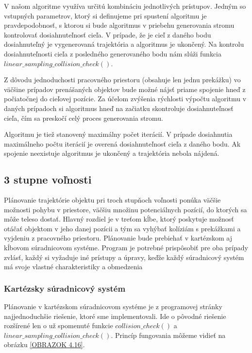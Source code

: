 V našom algoritme využíva určitú kombináciu jednotlivých prístupov.
Jedným so vstupných parametrov, ktorý si definujeme pri spustení algoritmu je pravdepodobnosť, s ktorou si bude algoritmus v priebehu generovania stromu kontrolovať dosiahnuteľnosť cieľa.  V prípade, že je cieľ z daného bodu dosiahnuteľný je vygenerovaná trajektória a algoritmus je ukončený. Na kontrolu dosiahnuteľnosti cieľa z posledného generovaného bodu nám slúži funkcia $ linear\_sampling\_collision\_check()$.

Z dôvodu jednoduchosti pracovného priestoru (obsahuje len jednu prekážku) vo väčšine prípadov prenášaných objektov bude možné nájsť priame spojenie hneď z počiatočnej do cieľovej pozície. Za účelom zvýšenia rýchlosti výpočtu algoritmu v daných prípadoch si algoritmus hneď na začiatku skontroluje dosiahnuteľnosť cieľa, čím sa preskočí celý proces generovania stromu.

Algoritmu je tiež stanovený maximálny počet iterácií. V prípade dosiahnutia maximálneho počtu iterácií je overená dosiahnuteľnosť cieľa z daného bodu. Ak spojenie neexistuje algoritmus je ukončený a trajektória nebola nájdená.

\subsection{3 stupne voľnosti}

Plánovanie trajektórie objektu pri troch stupňoch voľnosti ponúka väčšie možnosti pohybu v priestore, väčšiu množinu potenciálnych pozícií, do ktorých sa môže teleso dostať. Hlavný rozdiel je v treťom kĺbe, ktorý poskytuje možnosť otáčať objektom v jeho danej pozícii a tým sa vyhýbať kolíziám s prekážkami a vyjdeniu z pracovného priestoru. Plánovanie bude prebiehať v kartézskom aj kĺbovom súradnicovom systéme. Program je potrebné prispôsobiť pre oba prípady zvlásť, každý si vyžaduje iné prístupy a úpravy, keďže každý súradnicový systém má svoje vlastné charakteristiky a obmedzenia

\subsubsection{Kartézsky súradnicový systém}

Plánovanie v kartézskom súradnicovom systéme je z programovej stránky najjednoduchšie riešenie, ktoré sme implementovali. 
Ide o pôvodné riešenie rozšírené len o už spomenuté funkcie $ collision\_check() $ a $ linear\_sampling\_collision\_check()$. Princíp fungovania môžeme vidieť na obrázku \ref{OBRAZOK 4.16}.


